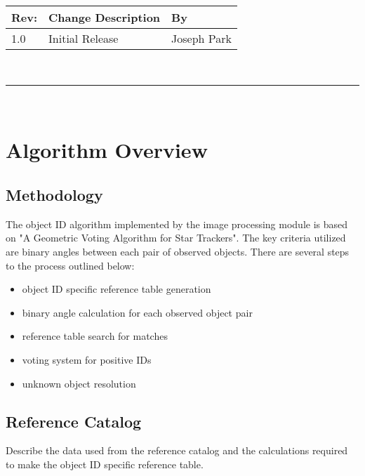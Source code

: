 \documentclass[]{DINOReportMemo}
\begin{document}
\makeCover


%
%
\pagestyle{empty}
{\renewcommand{\arraystretch}{2}
\noindent
\begin{longtable}{|p{0.5in}|p{4.5in}|p{1.14in}|}
\hline
{\bfseries Rev}: & {\bfseries Change Description} & {\bfseries By} \\
\hline
1.0 & Initial Release &  Joseph Park\\ %
\hline

\end{longtable}
}

\newpage
\setcounter{page}{1}
\pagestyle{fancy}

\tableofcontents
~\\ \hrule ~\\

\newpage
\section{Algorithm Overview}
\subsection{Methodology} The object ID algorithm implemented by the image processing module is based on "A Geometric Voting Algorithm for Star Trackers". The key criteria utilized are binary angles between each pair of observed objects. There are several steps to the process outlined below:
\begin{itemize}
  \item object ID specific reference table generation
  \item binary angle calculation for each observed object pair
  \item reference table search for matches
  \item voting system for positive IDs
  \item unknown object resolution\\
\end{itemize}

\subsection{Reference Catalog} Describe the data used from the reference catalog and the calculations required to make the object ID specific reference table. \\ 
\end{document}
